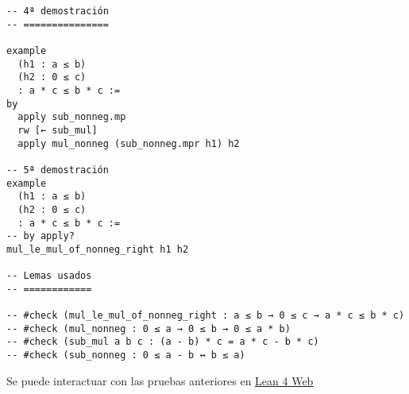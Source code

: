 \begin{verbatim}
-- 4ª demostración
-- ===============

example
  (h1 : a ≤ b)
  (h2 : 0 ≤ c)
  : a * c ≤ b * c :=
by
  apply sub_nonneg.mp
  rw [← sub_mul]
  apply mul_nonneg (sub_nonneg.mpr h1) h2

-- 5ª demostración
example
  (h1 : a ≤ b)
  (h2 : 0 ≤ c)
  : a * c ≤ b * c :=
-- by apply?
mul_le_mul_of_nonneg_right h1 h2

-- Lemas usados
-- ============

-- #check (mul_le_mul_of_nonneg_right : a ≤ b → 0 ≤ c → a * c ≤ b * c)
-- #check (mul_nonneg : 0 ≤ a → 0 ≤ b → 0 ≤ a * b)
-- #check (sub_mul a b c : (a - b) * c = a * c - b * c)
-- #check (sub_nonneg : 0 ≤ a - b ↔ b ≤ a)
\end{verbatim}
Se puede interactuar con las pruebas anteriores en \href{https://lean.math.hhu.de/\#url=https://raw.githubusercontent.com/jaalonso/Calculemus2/main/src/Ejercicio\_sobre\_anillos\_ordenados\_3.lean}{Lean 4 Web}




